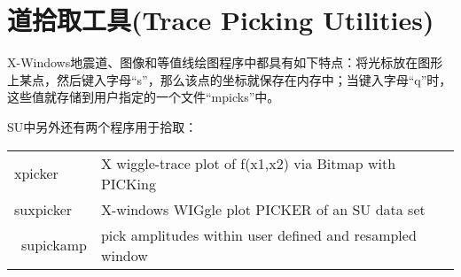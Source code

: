 \chapter{道拾取工具(Trace Picking Utilities)}
X-Windows地震道、图像和等值线绘图程序中都具有如下特点：将光标放在图形上某点，然后键入字母“s”，那么该点的坐标就保存在内存中；当键入字母“q”时，这些值就存储到用户指定的一个文件“mpicks”中。
\par
SU中另外还有两个程序用于拾取：\\
\begin{tabular}{ll}
	\toprule
	xpicker & X wiggle-trace plot of f(x1,x2) via Bitmap with PICKing\\
	suxpicker & X-windows WIGgle plot PICKER of an SU data set\\\
	supickamp & pick amplitudes within user defined and resampled window\\
	\bottomrule
\end{tabular}